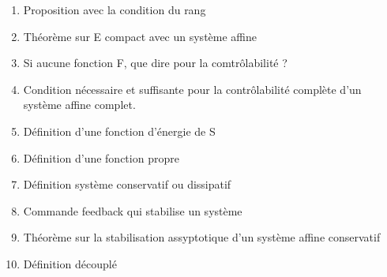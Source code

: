 \documentclass{article}
\begin{document}
\begin{enumerate}
\item Proposition avec la condition du rang
\item Théorème sur E compact avec un système affine
\item Si aucune fonction F, que dire pour la comtrôlabilité ?
\item Condition nécessaire et suffisante pour la contrôlabilité complète d'un système affine complet.
\item Définition d'une fonction d'énergie de S
\item Définition d'une fonction propre
\item Définition système conservatif ou dissipatif
\item Commande feedback qui stabilise un système
\item Théorème sur la stabilisation assyptotique d'un système affine conservatif
\item Définition découplé
\end{enumerate}
\end{document}
